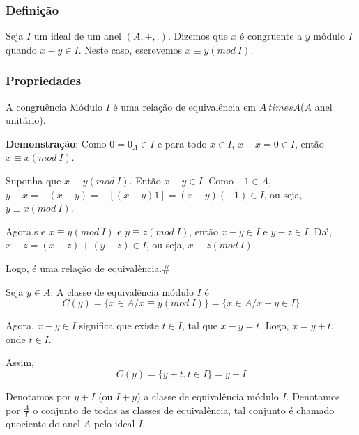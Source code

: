 \subsubsection{Defini{\c c}{\~a}o}
\begin{definicao} Seja $I$ um ideal de um anel $(A,+,.)$. Dizemos que $x$ {\'e} congruente a $y$ m{\'o}dulo $I$ quando $x-y\in I$. Neste caso, escrevemos $x\equiv y(mod\ I)$.\end{definicao}

\subsubsection{Propriedades}
\begin{proposicao} A congru{\^e}ncia M{\'o}dulo $I$ {\'e} uma rela{\c c}{\~a}o de equival{\^e}ncia em $A \ times A$($A$ anel unit{\'a}rio).\end{proposicao}

\textbf{Demonstra{\c c}{\~a}o}: Como $0=0_{A}\in I$ e para todo $x\in I$, $x-x=0\in I$, ent{\~a}o $x\equiv x(mod\ I)$.

Suponha que $x\equiv y(mod\ I)$. Ent{\~a}o $x-y\in I$. Como $-1\in A$,$y-x=-(x-y)=-[(x-y)1]=(x-y)(-1)\in I$, ou seja, $y\equiv x(mod\ I)$.

Agora,s e $x\equiv y(mod\ I)$ e $y\equiv z(mod\ I)$, ent{\~a}o $x-y\in I$ e $y-z\in I$. Da{\'\i}, $x-z=(x-z)+(y-z)\in I$, ou seja, $x\equiv z(mod\ I)$.

Logo, {\'e} uma rela{\c c}{\~a}o de equival{\^e}ncia.\#

Seja $y\in A$. A classe de equival{\^e}ncia m{\'o}dulo $I$ {\'e}
\[C(y)=\{x\in A/x\equiv y(mod\ I)\}=\{x\in A/x-y\in I\}\]


Agora, $x-y\in I$ significa que existe $t\in I$, tal que $x-y=t$. Logo, $x=y+t$, onde $t\in I$.

Assim,
\[C(y)=\{y+t,t\in I\}=y+I\]

\begin{nota} Denotamos por $y+I$ (ou $I+y$) a classe de equival{\^e}ncia m{\'o}dulo $I$. Denotamos por $\displaystyle\frac{A}{I}$ o conjunto de todas as classes de equival{\^e}ncia, tal conjunto {\'e} chamado quociente do anel $A$ pelo ideal $I$.\end{nota}

